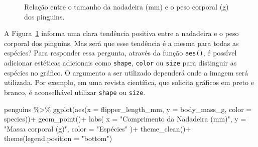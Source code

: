 \documentclass[
  12pt,
  letterpaper,
  DIV=11,
  numbers=noendperiod]{scrreprt}
\newenvironment{Shaded}{\begin{snugshade}}{\end{snugshade}}
\newcommand{\AttributeTok}[1]{\textcolor[rgb]{0.40,0.45,0.13}{#1}}
\newcommand{\FunctionTok}[1]{\textcolor[rgb]{0.28,0.35,0.67}{#1}}
\newcommand{\NormalTok}[1]{\textcolor[rgb]{0.00,0.23,0.31}{#1}}
\newcommand{\SpecialCharTok}[1]{\textcolor[rgb]{0.37,0.37,0.37}{#1}}
\newcommand{\StringTok}[1]{\textcolor[rgb]{0.13,0.47,0.30}{#1}}
\theoremstyle{definition}
\theoremstyle{exemplo}
\begin{document}
\begin{figure}[H]


\caption{\label{fig-dis-peso-nad}Relação entre o tamanho da nadadeira
(mm) e o peso corporal (g) dos pinguins.}

\end{figure}%

\noindent A Figura~\ref{fig-dis-peso-nad} informa uma clara tendência
positiva entre a nadadeira e o peso corporal dos pinguins. Mas será que
esse tendência é a mesma para todas as espécies? Para responder essa
pergunta, através da função \texttt{aes()}, é possível adicionar
estéticas adicionais como \texttt{shape}, \texttt{color} ou
\texttt{size} para distinguir as espécies no gráfico. O argumento a ser
utilizado dependerá onde a imagem será utilizada. Por exemplo, em uma
revista científica, que solicita gráficos em preto e branco, é
aconselhável utilizar \texttt{shape} ou \texttt{size}.

\begin{Shaded}
\begin{Highlighting}[]
\NormalTok{penguins }\SpecialCharTok{\%\textgreater{}\%} 
  \FunctionTok{ggplot}\NormalTok{(}\FunctionTok{aes}\NormalTok{(}\AttributeTok{x =}\NormalTok{ flipper\_length\_mm, }\AttributeTok{y =}\NormalTok{ body\_mass\_g, }\AttributeTok{color =}\NormalTok{ species))}\SpecialCharTok{+}
    \FunctionTok{geom\_point}\NormalTok{()}\SpecialCharTok{+}
    \FunctionTok{labs}\NormalTok{(}
      \AttributeTok{x =} \StringTok{"Comprimento da Nadadeira (mm)"}\NormalTok{,}
      \AttributeTok{y =} \StringTok{"Massa corporal (g)"}\NormalTok{,}
      \AttributeTok{color =} \StringTok{"Espécies"}
\NormalTok{    )}\SpecialCharTok{+}
    \FunctionTok{theme\_clean}\NormalTok{()}\SpecialCharTok{+}
    \FunctionTok{theme}\NormalTok{(}\AttributeTok{legend.position =} \StringTok{"bottom"}\NormalTok{)}
\end{Highlighting}
\end{Shaded}
\end{document}
